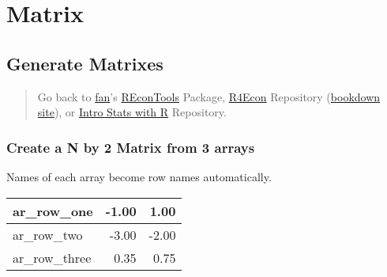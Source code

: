 \documentclass[
]{book}
\newenvironment{Shaded}{\begin{snugshade}}{\end{snugshade}}
\newcommand{\DecValTok}[1]{\textcolor[rgb]{0.00,0.00,0.81}{#1}}
\newcommand{\FloatTok}[1]{\textcolor[rgb]{0.00,0.00,0.81}{#1}}
\newcommand{\KeywordTok}[1]{\textcolor[rgb]{0.13,0.29,0.53}{\textbf{#1}}}
\newcommand{\NormalTok}[1]{#1}
\newcommand{\OperatorTok}[1]{\textcolor[rgb]{0.81,0.36,0.00}{\textbf{#1}}}
\newcommand{\StringTok}[1]{\textcolor[rgb]{0.31,0.60,0.02}{#1}}
\begin{document}
\hypertarget{matrix}{%
\section{Matrix}\label{matrix}}

\hypertarget{generate-matrixes}{%
\subsection{Generate Matrixes}\label{generate-matrixes}}

\begin{quote}
Go back to \href{http://fanwangecon.github.io/}{fan}'s \href{https://fanwangecon.github.io/REconTools/}{REconTools} Package, \href{https://fanwangecon.github.io/R4Econ/}{R4Econ} Repository (\href{https://fanwangecon.github.io/R4Econ/bookdown}{bookdown site}), or \href{https://fanwangecon.github.io/Stat4Econ/}{Intro Stats with R} Repository.
\end{quote}

\hypertarget{create-a-n-by-2-matrix-from-3-arrays}{%
\subsubsection{Create a N by 2 Matrix from 3 arrays}\label{create-a-n-by-2-matrix-from-3-arrays}}

Names of each array become row names automatically.

\begin{Shaded}
\end{Shaded}

\begin{table}[!h]
\centering
\begin{tabular}{l|r|r}
\hline
ar\_row\_one & -1.00 & 1.00\\
\hline
\rowcolor{gray!6}  ar\_row\_two & -3.00 & -2.00\\
\hline
ar\_row\_three & 0.35 & 0.75\\
\hline
\end{tabular}
\end{table}
\end{document}
